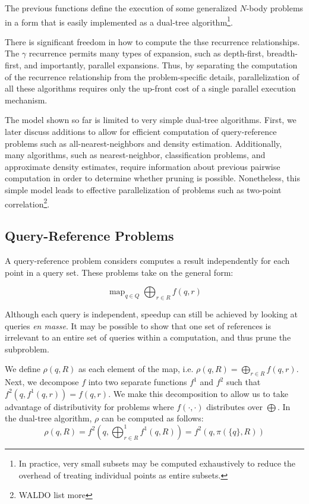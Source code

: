 \documentclass[times, 10pt,twocolumn]{article}
\DeclareMathOperator*{\map}{map}
\begin{document}
\noindent The previous functions define the execution of some generalized $N$-body problems in a form that is easily implemented as a dual-tree algorithm\footnote{In practice, very small subsets may be computed exhaustively to reduce the overhead of treating individual points as entire subsets.}.

There is significant freedom in how to compute the thse recurrence relationships.
The $\gamma$ recurrence permits many types of expansion, such as depth-first, breadth-first, and importantly, parallel expansions.
Thus, by separating the computation of the recurrence relationship from the problem-specific details, parallelization of all these algorithms requires only the up-front cost of a single parallel execution mechanism.

The model shown so far is limited to very simple dual-tree algorithms.
First, we later discuss additions to allow for efficient computation of query-reference problems such as all-nearest-neighbors and density estimation.
Additionally, many algorithms, such as nearest-neighbor, classification problems, and approximate density estimates, require information about previous pairwise computation in order to determine whether pruning is possible.
Nonetheless, this simple model leads to effective parallelization of problems such as two-point correlation\footnote{WALDO list more}.

\subsection{Query-Reference Problems}


A query-reference problem considers computes a result independently for each point in a query set.
These problems take on the general form:
 
  $$\map_{q \in Q} \bigoplus_{r \in R} f(q, r)$$

Although each query is independent, speedup can still be achieved by looking at queries {\it en masse}.
It may be possible to show that one set of references is irrelevant to an entire set of queries within a computation, and thus prune the subproblem.

We define $\rho(q, R)$ as each element of the map, i.e. $\rho(q, R) = \bigoplus_{r \in R} f(q, r)$.
Next, we decompose $f$ into two separate functions $f^1$ and $f^2$ such that $f^2(q, f^1(q, r)) = f(q, r)$.
We make this decomposition to allow us to take advantage of distributivity for problems where $f(\cdot, \cdot)$ distributes over $\bigoplus$.
In the dual-tree algorithm, $\rho$ can be computed as follows:
\begin{equation}
  \label{eqn:rho}
  \rho(q, R) = f^{2}(q, \bigoplus^{1}_{r \in R} f^{1}(q, R)) = f^{2}(q, \pi(\{q\}, R))
  \end{equation}
  
\end{document}
